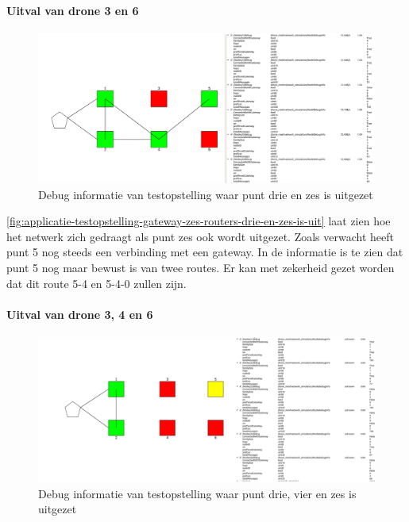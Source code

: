 \documentclass[a4paper, 11pt, oneside]{report}
\begin{document}
\paragraph{Uitval van drone 3 en 6}
\begin{figure}[H]
	\begin{center}\includegraphics[width=\linewidth]{Afbeeldingen/testopstelling1_drie_en_zes_is_uit.png}\end{center}
	\caption{Debug informatie van testopstelling waar punt drie en zes is uitgezet}
	\label{fig:applicatie-testopstelling-gateway-zes-routers-drie-en-zes-is-uit}
\end{figure}

\autoref{fig:applicatie-testopstelling-gateway-zes-routers-drie-en-zes-is-uit} laat zien hoe het netwerk zich gedraagt als punt zes ook wordt uitgezet.
Zoals verwacht heeft punt 5 nog steeds een verbinding met een gateway.
In de informatie is te zien dat punt 5 nog maar bewust is van twee routes. 
Er kan met zekerheid gezet worden dat dit route 5-4 en 5-4-0 zullen zijn.

\paragraph{Uitval van drone 3, 4 en 6}
\begin{figure}[H]
	\begin{center}\includegraphics[width=\linewidth]{Afbeeldingen/testopstellingmetzes_drie-vier-zes-uit.png}\end{center}
	\caption{Debug informatie van testopstelling waar punt drie, vier en zes is uitgezet}
	\label{fig:applicatie-testopstelling-gateway-zes-routers-drie-vier-en-zes-is-uit}
\end{figure}
\end{document}
